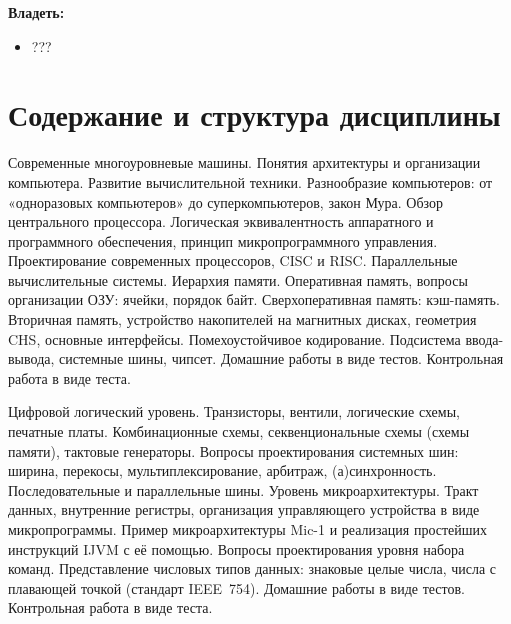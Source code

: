 \textbf{Владеть:}
	\begin{itemize}
		\item ???
	\end{itemize}

\section{Содержание и структура дисциплины}
	







\myunit
	{Современные многоуровневые машины. Понятия архитектуры и организации компьютера. Развитие вычислительной техники. Разнообразие компьютеров: от «одноразовых компьютеров» до суперкомпьютеров, закон Мура. Обзор центрального процессора. Логическая эквивалентность аппаратного и программного обеспечения, принцип микропрограммного управления. Проектирование современных процессоров, CISC и RISC. Параллельные вычислительные системы. 
	Иерархия памяти. Оперативная память, вопросы организации ОЗУ: ячейки, порядок байт. Сверхоперативная память: кэш-память. 
	Вторичная память, устройство накопителей на магнитных дисках, геометрия CHS, основные интерфейсы. Помехоустойчивое кодирование. 
	Подсистема ввода-вывода, системные шины, чипсет.}
	{Домашние работы в виде тестов. Контрольная работа в виде теста.}

\myunit
	{Цифровой логический уровень. Транзисторы, вентили, логические схемы, печатные платы. Комбинационные схемы, секвенциональные схемы (схемы памяти), тактовые генераторы. Вопросы проектирования системных шин: ширина, перекосы, мультиплексирование, арбитраж, (а)синхронность. Последовательные и параллельные шины.
	Уровень микроархитектуры. Тракт данных, внутренние регистры, организация управляющего устройства в виде микропрограммы. Пример микроархитектуры Mic-1 и реализация простейших инструкций IJVM с её помощью.
	Вопросы проектирования уровня набора команд. Представление числовых типов данных: знаковые целые числа, числа с плавающей точкой (стандарт IEEE~754).}
	{Домашние работы в виде тестов. Контрольная работа в виде теста.}

